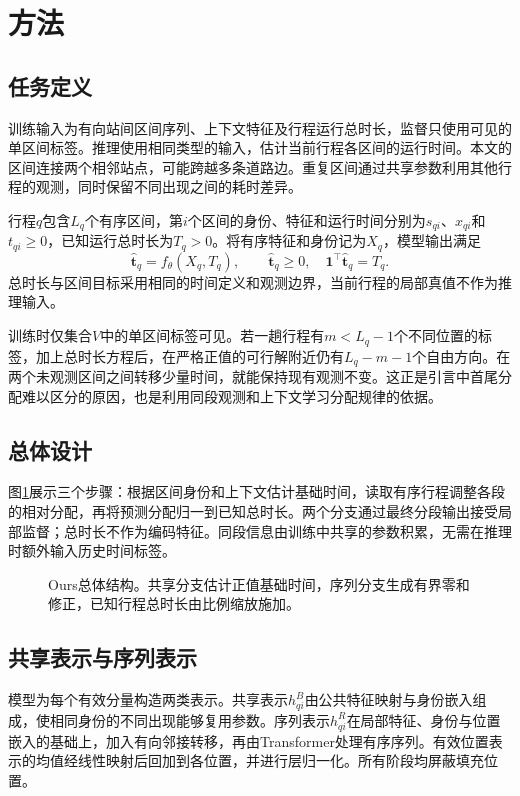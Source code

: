 \section{方法}
\subsection{任务定义}
训练输入为有向站间区间序列、上下文特征及行程运行总时长，监督只使用可见的单区间标签。推理使用相同类型的输入，估计当前行程各区间的运行时间。本文的区间连接两个相邻站点，可能跨越多条道路边。重复区间通过共享参数利用其他行程的观测，同时保留不同出现之间的耗时差异。

行程$q$包含$L_q$个有序区间，第$i$个区间的身份、特征和运行时间分别为$s_{qi}$、$x_{qi}$和$t_{qi}\geq0$，已知运行总时长为$T_q>0$。将有序特征和身份记为$X_q$，模型输出满足
\begin{equation}
\hat{\boldsymbol t}_q=f_\theta(X_q,T_q),\qquad
\hat{\boldsymbol t}_q\geq0,\quad
\boldsymbol1^\top\hat{\boldsymbol t}_q=T_q.
\label{eq:task}
\end{equation}
总时长与区间目标采用相同的时间定义和观测边界，当前行程的局部真值不作为推理输入。

训练时仅集合$V$中的单区间标签可见。若一趟行程有$m<L_q-1$个不同位置的标签，加上总时长方程后，在严格正值的可行解附近仍有$L_q-m-1$个自由方向。在两个未观测区间之间转移少量时间，就能保持现有观测不变。这正是引言中首尾分配难以区分的原因，也是利用同段观测和上下文学习分配规律的依据。

\subsection{总体设计}
图\ref{fig:framework}展示三个步骤：根据区间身份和上下文估计基础时间，读取有序行程调整各段的相对分配，再将预测分配归一到已知总时长。两个分支通过最终分段输出接受局部监督；总时长不作为编码特征。同段信息由训练中共享的参数积累，无需在推理时额外输入历史时间标签。
\begin{figure}[t]
\centering
\rule{0pt}{1.5in}
\caption{Ours总体结构。共享分支估计正值基础时间，序列分支生成有界零和修正，已知行程总时长由比例缩放施加。}\label{fig:framework}
\end{figure}
\subsection{共享表示与序列表示}
模型为每个有效分量构造两类表示。共享表示$h^B_{qi}$由公共特征映射与身份嵌入组成，使相同身份的不同出现能够复用参数。序列表示$h^R_{qi}$在局部特征、身份与位置嵌入的基础上，加入有向邻接转移，再由Transformer处理有序序列。有效位置表示的均值经线性映射后回加到各位置，并进行层归一化。所有阶段均屏蔽填充位置。

